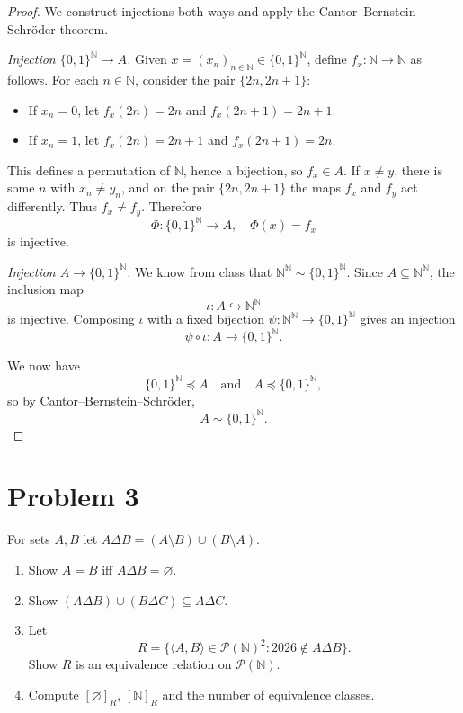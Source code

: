 \documentclass[answers,12pt,addpoints]{exam}
\begin{document}
\begin{proof}
We construct injections both ways and apply the Cantor--Bernstein--Schröder theorem.

\smallskip

\emph{Injection $\{0,1\}^{\mathbb{N}} \to A$.}
Given $x = (x_n)_{n\in\mathbb{N}} \in \{0,1\}^{\mathbb{N}}$, define $f_x : \mathbb{N} \to \mathbb{N}$ as follows.
For each $n \in \mathbb{N}$, consider the pair $\{2n, 2n+1\}$:
\begin{itemize}
    \item If $x_n = 0$, let $f_x(2n) = 2n$ and $f_x(2n+1) = 2n+1$.
    \item If $x_n = 1$, let $f_x(2n) = 2n+1$ and $f_x(2n+1) = 2n$.
\end{itemize}
This defines a permutation of $\mathbb{N}$, hence a bijection, so $f_x \in A$.
If $x \neq y$, there is some $n$ with $x_n \neq y_n$, and on the pair
$\{2n,2n+1\}$ the maps $f_x$ and $f_y$ act differently. Thus $f_x \neq f_y$.
Therefore
\[
\Phi : \{0,1\}^{\mathbb{N}} \to A,\quad \Phi(x) = f_x
\]
is injective.

\smallskip

\emph{Injection $A \to \{0,1\}^{\mathbb{N}}$.}
We know from class that $\mathbb{N}^{\mathbb{N}} \sim \{0,1\}^{\mathbb{N}}$.
Since $A \subseteq \mathbb{N}^{\mathbb{N}}$, the inclusion map
\[
\iota : A \hookrightarrow \mathbb{N}^{\mathbb{N}}
\]
is injective. Composing $\iota$ with a fixed bijection
$\psi : \mathbb{N}^{\mathbb{N}} \to \{0,1\}^{\mathbb{N}}$ gives an injection
\[
\psi \circ \iota : A \to \{0,1\}^{\mathbb{N}}.
\]

We now have
\[
\{0,1\}^{\mathbb{N}} \preceq A
\quad\text{and}\quad
A \preceq \{0,1\}^{\mathbb{N}},
\]
so by Cantor--Bernstein--Schröder,
\[
A \sim \{0,1\}^{\mathbb{N}}.
\]
\end{proof}

\section*{Problem 3}
For sets $A,B$ let $A \Delta B = (A \setminus B) \cup (B \setminus A)$.
\begin{enumerate}
    \item[(i)] Show $A = B$ iff $A \Delta B = \varnothing$.
    \item[(ii)] Show $(A \Delta B) \cup (B \Delta C) \subseteq A \Delta C$.
    \item[(iii)] Let
    \[
    R = \{\langle A,B\rangle \in \mathcal{P}(\mathbb{N})^2 : 2026 \notin A \Delta B\}.
    \]
    Show $R$ is an equivalence relation on $\mathcal{P}(\mathbb{N})$.
    \item[(iv)] Compute $[\varnothing]_R$, $[\mathbb{N}]_R$ and the number of
    equivalence classes.
\end{enumerate}
\end{document}
